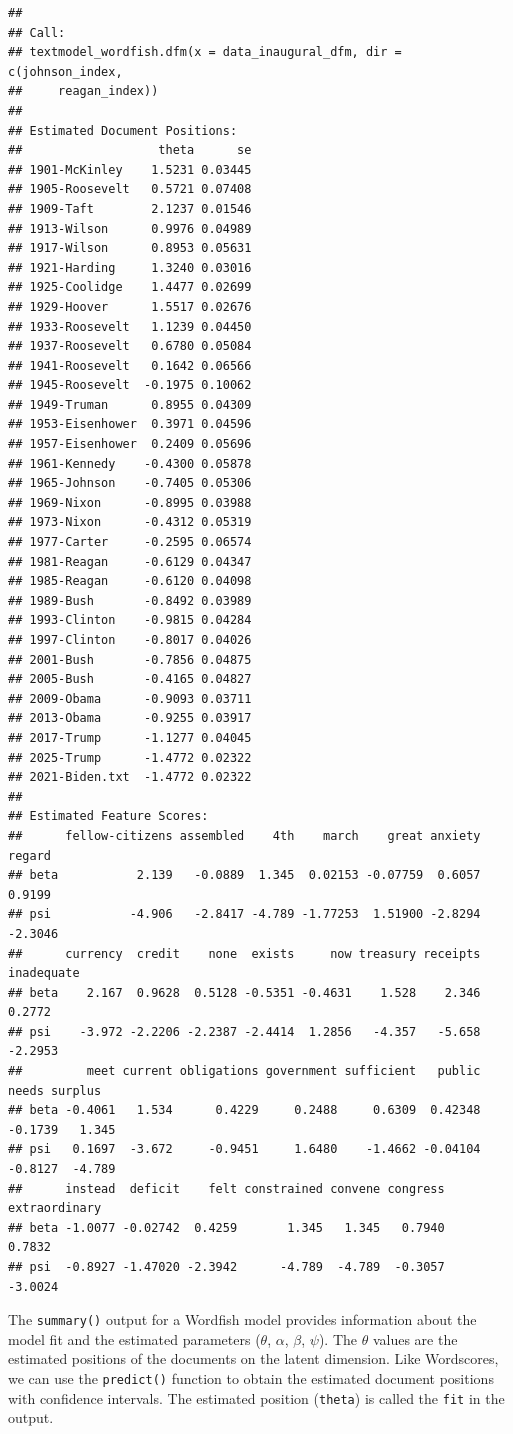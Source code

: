 \documentclass[
]{book}
\begin{document}
\begin{verbatim}
## 
## Call:
## textmodel_wordfish.dfm(x = data_inaugural_dfm, dir = c(johnson_index, 
##     reagan_index))
## 
## Estimated Document Positions:
##                   theta      se
## 1901-McKinley    1.5231 0.03445
## 1905-Roosevelt   0.5721 0.07408
## 1909-Taft        2.1237 0.01546
## 1913-Wilson      0.9976 0.04989
## 1917-Wilson      0.8953 0.05631
## 1921-Harding     1.3240 0.03016
## 1925-Coolidge    1.4477 0.02699
## 1929-Hoover      1.5517 0.02676
## 1933-Roosevelt   1.1239 0.04450
## 1937-Roosevelt   0.6780 0.05084
## 1941-Roosevelt   0.1642 0.06566
## 1945-Roosevelt  -0.1975 0.10062
## 1949-Truman      0.8955 0.04309
## 1953-Eisenhower  0.3971 0.04596
## 1957-Eisenhower  0.2409 0.05696
## 1961-Kennedy    -0.4300 0.05878
## 1965-Johnson    -0.7405 0.05306
## 1969-Nixon      -0.8995 0.03988
## 1973-Nixon      -0.4312 0.05319
## 1977-Carter     -0.2595 0.06574
## 1981-Reagan     -0.6129 0.04347
## 1985-Reagan     -0.6120 0.04098
## 1989-Bush       -0.8492 0.03989
## 1993-Clinton    -0.9815 0.04284
## 1997-Clinton    -0.8017 0.04026
## 2001-Bush       -0.7856 0.04875
## 2005-Bush       -0.4165 0.04827
## 2009-Obama      -0.9093 0.03711
## 2013-Obama      -0.9255 0.03917
## 2017-Trump      -1.1277 0.04045
## 2025-Trump      -1.4772 0.02322
## 2021-Biden.txt  -1.4772 0.02322
## 
## Estimated Feature Scores:
##      fellow-citizens assembled    4th    march    great anxiety  regard
## beta           2.139   -0.0889  1.345  0.02153 -0.07759  0.6057  0.9199
## psi           -4.906   -2.8417 -4.789 -1.77253  1.51900 -2.8294 -2.3046
##      currency  credit    none  exists     now treasury receipts inadequate
## beta    2.167  0.9628  0.5128 -0.5351 -0.4631    1.528    2.346     0.2772
## psi    -3.972 -2.2206 -2.2387 -2.4414  1.2856   -4.357   -5.658    -2.2953
##         meet current obligations government sufficient   public   needs surplus
## beta -0.4061   1.534      0.4229     0.2488     0.6309  0.42348 -0.1739   1.345
## psi   0.1697  -3.672     -0.9451     1.6480    -1.4662 -0.04104 -0.8127  -4.789
##      instead  deficit    felt constrained convene congress extraordinary
## beta -1.0077 -0.02742  0.4259       1.345   1.345   0.7940        0.7832
## psi  -0.8927 -1.47020 -2.3942      -4.789  -4.789  -0.3057       -3.0024
\end{verbatim}

The \texttt{summary()} output for a Wordfish model provides information about the model fit and the estimated parameters (\(\theta\), \(\alpha\), \(\beta\), \(\psi\)). The \(\theta\) values are the estimated positions of the documents on the latent dimension. Like Wordscores, we can use the \texttt{predict()} function to obtain the estimated document positions with confidence intervals. The estimated position (\texttt{theta}) is called the \texttt{fit} in the output.
\end{document}
